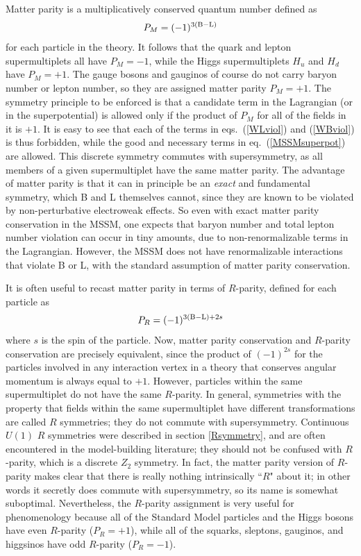 \documentclass[11pt]{article}
\def\beq{\begin{eqnarray}}
\def\eeq{\end{eqnarray}}
\def\Baryon{{\rm B}}
\def\Lepton{{\rm L}}
\begin{document}
Matter parity is a multiplicatively conserved quantum number defined as
\beq
P_M = (-1)^{3 (\Baryon-\Lepton)}
\label{defmatterparity}
\eeq
for each particle in the theory. It follows that the quark and
lepton supermultiplets all have $P_M=-1$, while the Higgs supermultiplets
$H_u$ and $H_d$ have $P_M=+1$. The gauge bosons and gauginos of course do
not carry baryon number or lepton number, so they are assigned matter
parity $P_M=+1$. The symmetry principle to be enforced is that a candidate
term in the Lagrangian (or in the superpotential) is allowed only if the
product of $P_M$ for all of the fields in it is $+1$. It is easy to see
that each of the terms in eqs.~(\ref{WLviol}) and (\ref{WBviol}) is thus
forbidden, while the good and necessary terms in eq.~(\ref{MSSMsuperpot})
are allowed. This discrete symmetry commutes with supersymmetry, as all
members of a given supermultiplet have the same matter parity. The
advantage of matter parity is that it can in principle be an {\it exact}
and fundamental symmetry, which B and L themselves cannot, since they are
known to be violated by non-perturbative electroweak effects. So even with
exact matter parity conservation in the MSSM, one expects that baryon
number and total lepton number violation can occur in tiny amounts, due to
non-renormalizable terms in the Lagrangian. However, the MSSM does not have
renormalizable interactions that violate B or L, with the standard
assumption of matter parity conservation.

It is often useful to recast matter parity in terms of $R$-parity,
defined for each particle as
\beq
P_R = (-1)^{3(\Baryon-\Lepton) + 2 s}
\label{defRparity}
\eeq
where $s$ is the spin of the particle. Now, matter parity conservation and
$R$-parity conservation are precisely equivalent, since the product of
$(-1)^{2s}$ for the particles involved in any interaction vertex in a
theory that conserves angular momentum is always equal to $+1$. However,
particles within the same supermultiplet do not have the same $R$-parity.
In general, symmetries with the property that fields within the same
supermultiplet have different transformations are called $R$ symmetries;  
they do not commute with supersymmetry.  Continuous $U(1)$ $R$ symmetries
were described in section \ref{Rsymmetry}, and
are often encountered in the model-building literature; they should not be
confused with $R$-parity, which is a discrete $Z_2$ symmetry. In fact, the
matter parity version of $R$-parity makes clear that there is really
nothing intrinsically ``$R$" about it; in other words it secretly does
commute with supersymmetry, so its name is somewhat suboptimal.
Nevertheless, the $R$-parity assignment is very useful for phenomenology
because all of the Standard Model particles and the Higgs bosons have even
$R$-parity ($P_R=+1$), while all of the squarks, sleptons, gauginos, and
higgsinos have odd $R$-parity ($P_R=-1$).
\end{document}
